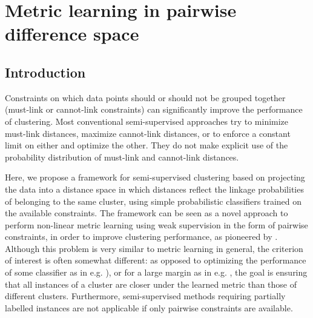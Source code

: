 %
%
%
%
%

\chapter{Metric learning in pairwise difference space}
\label{apx:adsmetric}

\section*{Introduction}

Constraints on which data points should or should not be grouped together (must-link or cannot-link constraints) can significantly improve the performance of clustering. Most conventional semi-supervised approaches try to minimize must-link distances, maximize cannot-link distances, or to enforce a constant limit on either and optimize the other. They do not make explicit use of the probability distribution of must-link and cannot-link distances. 

Here, we propose a framework for semi-supervised clustering based on projecting the data into a distance space in which distances reflect the linkage probabilities of belonging to the same cluster, using simple probabilistic classifiers trained on the available constraints. The framework can be seen as a novel approach to perform non-linear metric learning using weak supervision in the form of pairwise constraints, in order to improve clustering performance, as pioneered by \citep{xing2002distance}. Although this problem is very similar to metric learning in general, the criterion of interest is often somewhat different: as opposed to optimizing the performance of some classifier as in e.g. \citep{bellet2012similarity}), or for a large margin as in e.g. \citep{weinberger2005distance}, the goal is ensuring that all instances of a cluster are closer under the learned metric than those of different clusters. Furthermore, semi-supervised methods requiring partially labelled instances are not applicable if only pairwise constraints are available. 

